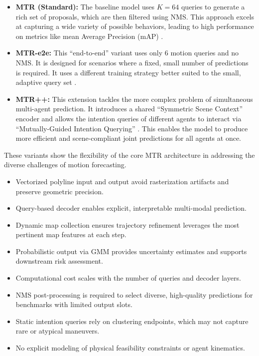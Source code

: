 \begin{itemize}
    \item \textbf{MTR (Standard):} The baseline model uses $K=64$ queries to generate a rich set of proposals, which are then filtered using NMS. This approach excels at capturing a wide variety of possible behaviors, leading to high performance on metrics like mean Average Precision (mAP) \cite{Shi2022MTR}.
    \item \textbf{MTR-e2e:} This ``end-to-end'' variant uses only 6 motion queries and no NMS. It is designed for scenarios where a fixed, small number of predictions is required. It uses a different training strategy better suited to the small, adaptive query set \cite{Shi2022MTR}.
    \item \textbf{MTR++:} This extension tackles the more complex problem of simultaneous multi-agent prediction. It introduces a shared ``Symmetric Scene Context'' encoder and allows the intention queries of different agents to interact via ``Mutually-Guided Intention Querying'' \cite{Shi2023MTRplusplus}. This enables the model to produce more efficient and scene-compliant joint predictions for all agents at once.
\end{itemize}

These variants show the flexibility of the core MTR architecture in addressing the diverse challenges of motion forecasting.

\begin{itemize}[leftmargin=*, label=\greenoplus]
  \item Vectorized polyline input and output avoid rasterization artifacts and preserve geometric precision.
  \item Query-based decoder enables explicit, interpretable multi-modal prediction.
  \item Dynamic map collection ensures trajectory refinement leverages the most pertinent map features at each step.
  \item Probabilistic output via GMM provides uncertainty estimates and supports downstream risk assessment.
\end{itemize}

\begin{itemize}[leftmargin=*, label=\redominus]
  \item Computational cost scales with the number of queries and decoder layers.
  \item NMS post-processing is required to select diverse, high-quality predictions for benchmarks with limited output slots.
  \item Static intention queries rely on clustering endpoints, which may not capture rare or atypical maneuvers.
  \item No explicit modeling of physical feasibility constraints or agent kinematics.
\end{itemize}